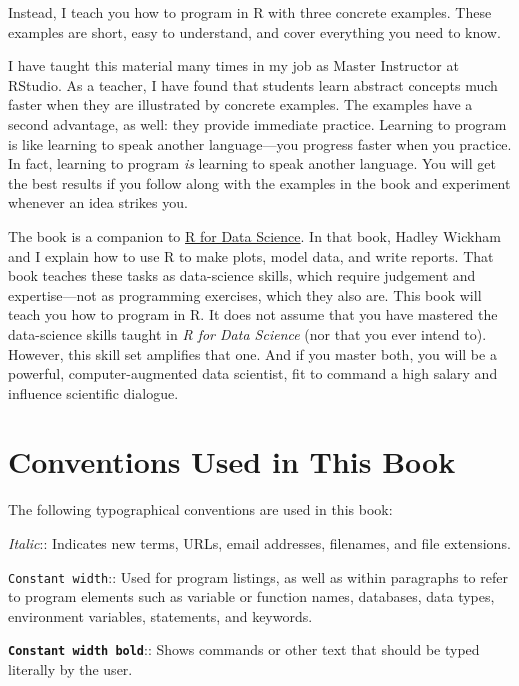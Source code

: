 \documentclass[
  letterpaper,
  DIV=11,
  numbers=noendperiod]{scrbook}
\begin{document}
Instead, I teach you how to program in R with three concrete examples.
These examples are short, easy to understand, and cover everything you
need to know.

I have taught this material many times in my job as Master Instructor at
RStudio. As a teacher, I have found that students learn abstract
concepts much faster when they are illustrated by concrete examples. The
examples have a second advantage, as well: they provide immediate
practice. Learning to program is like learning to speak another
language---you progress faster when you practice. In fact, learning to
program \emph{is} learning to speak another language. You will get the
best results if you follow along with the examples in the book and
experiment whenever an idea strikes you.

The book is a companion to \href{http://r4ds.had.co.nz/}{R for Data
Science}. In that book, Hadley Wickham and I explain how to use R to
make plots, model data, and write reports. That book teaches these tasks
as data-science skills, which require judgement and expertise---not as
programming exercises, which they also are. This book will teach you how
to program in R. It does not assume that you have mastered the
data-science skills taught in \emph{R for Data Science} (nor that you
ever intend to). However, this skill set amplifies that one. And if you
master both, you will be a powerful, computer-augmented data scientist,
fit to command a high salary and influence scientific dialogue.

\section*{Conventions Used in This
Book}\label{conventions-used-in-this-book}


The following typographical conventions are used in this book:

\emph{Italic}:: Indicates new terms, URLs, email addresses, filenames,
and file extensions.

\texttt{Constant\ width}:: Used for program listings, as well as within
paragraphs to refer to program elements such as variable or function
names, databases, data types, environment variables, statements, and
keywords.

\textbf{\texttt{Constant\ width\ bold}}:: Shows commands or other text
that should be typed literally by the user.
\end{document}
